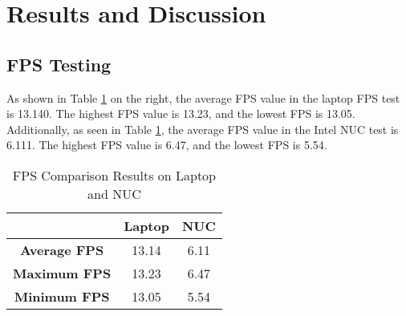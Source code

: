 \section{Results and Discussion}
\label{sec:resultsanddiscussion}

\subsection{FPS Testing}

As shown in Table \ref{tb:FPSLaptop} on the right, the average FPS value in the laptop FPS test is 13.140. The highest FPS value is 13.23, and the lowest FPS is 13.05. Additionally, as seen in Table \ref{tb:FPSLaptop}, the average FPS value in the Intel NUC test is 6.111. The highest FPS value is 6.47, and the lowest FPS is 5.54.
\begin{table}[H]
    \centering
    \caption{FPS Comparison Results on Laptop and NUC}
    \label{tb:FPSLaptop}
    \begin{tabular}{|c|c|c|}
        \hline 
        \cellcolor[HTML]{000000}                        & \cellcolor[HTML]{C0C0C0} \textbf{Laptop}  & \cellcolor[HTML]{C0C0C0} \textbf{NUC}  \\ \hline
        \cellcolor[HTML]{C0C0C0} \textbf{Average FPS} & 13.14                                      & 6.11                                    \\ \hline
        \cellcolor[HTML]{C0C0C0} \textbf{Maximum FPS}  & 13.23                                      & 6.47                                   \\ \hline
        \cellcolor[HTML]{C0C0C0} \textbf{Minimum FPS}   & 13.05                                      & 5.54                                    \\ \hline
    \end{tabular}
\end{table}

